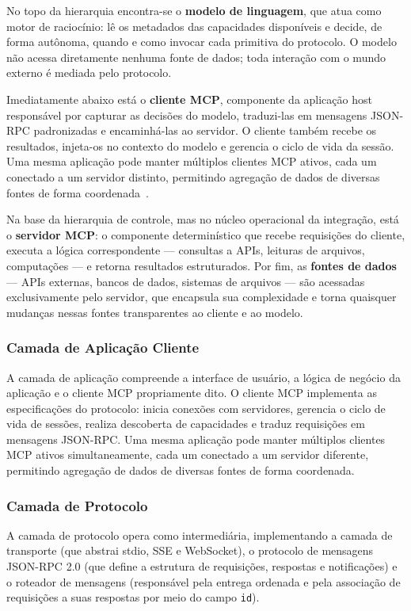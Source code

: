 \documentclass[12pt]{article}
\begin{document}
No topo da hierarquia encontra-se o \textbf{modelo de linguagem}, que
atua como motor de raciocínio: lê os metadados das capacidades
disponíveis e decide, de forma autônoma, quando e como invocar cada
primitiva do protocolo. O modelo não acessa diretamente nenhuma fonte de
dados; toda interação com o mundo externo é mediada pelo protocolo.

Imediatamente abaixo está o \textbf{cliente MCP}, componente da aplicação
host responsável por capturar as decisões do modelo, traduzi-las em
mensagens JSON-RPC padronizadas e encaminhá-las ao servidor. O cliente
também recebe os resultados, injeta-os no contexto do modelo e gerencia o
ciclo de vida da sessão. Uma mesma aplicação pode manter múltiplos
clientes MCP ativos, cada um conectado a um servidor distinto, permitindo
agregação de dados de diversas fontes de forma coordenada~\cite{workos2025mcp}.

Na base da hierarquia de controle, mas no núcleo operacional da
integração, está o \textbf{servidor MCP}: o componente determinístico que
recebe requisições do cliente, executa a lógica correspondente --- consultas
a APIs, leituras de arquivos, computações --- e retorna resultados
estruturados. Por fim, as \textbf{fontes de dados} --- APIs externas, bancos
de dados, sistemas de arquivos --- são acessadas exclusivamente pelo
servidor, que encapsula sua complexidade e torna quaisquer mudanças nessas
fontes transparentes ao cliente e ao modelo.

\subsubsection{Camada de Aplicação Cliente}

A camada de aplicação compreende a interface de usuário, a lógica de
negócio da aplicação e o cliente MCP propriamente dito. O cliente MCP
implementa as especificações do protocolo: inicia conexões com servidores,
gerencia o ciclo de vida de sessões, realiza descoberta de capacidades e
traduz requisições em mensagens JSON-RPC. Uma mesma aplicação pode manter
múltiplos clientes MCP ativos simultaneamente, cada um conectado a um
servidor diferente, permitindo agregação de dados de diversas fontes de
forma coordenada.

\subsubsection{Camada de Protocolo}

A camada de protocolo opera como intermediária, implementando a camada de
transporte (que abstrai stdio, SSE e WebSocket), o protocolo de mensagens
JSON-RPC 2.0 (que define a estrutura de requisições, respostas e
notificações) e o roteador de mensagens (responsável pela entrega
ordenada e pela associação de requisições a suas respostas por meio do
campo \texttt{id}).
\end{document}
